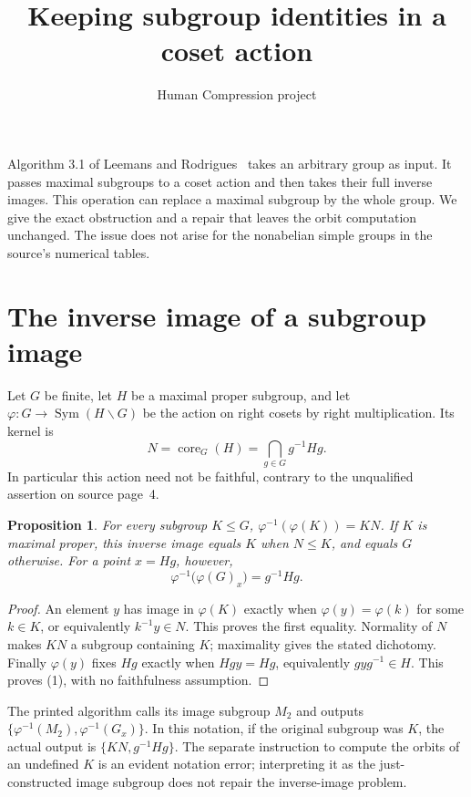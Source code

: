 \documentclass[10pt,a4paper]{article}
\title{Keeping subgroup identities in a coset action}
\author{Human Compression project}
\date{}
\newtheorem{proposition}{Proposition}
\newcommand{\core}{\operatorname{core}}
\begin{document}
\maketitle

Algorithm 3.1 of Leemans and Rodrigues~\cite{LR} takes an arbitrary
group as input. It passes maximal subgroups to a coset action and then
takes their full inverse images. This operation can replace a maximal
subgroup by the whole group. We give the exact obstruction and a repair
that leaves the orbit computation unchanged. The issue does not arise
for the nonabelian simple groups in the source's numerical tables.

\section{The inverse image of a subgroup image}
Let $G$ be finite, let $H$ be a maximal proper subgroup, and let
$\varphi:G\longrightarrow\operatorname{Sym}(H\backslash G)$
be the action on right cosets by right multiplication. Its kernel is
\[
 N=\core_G(H)=\bigcap_{g\in G}g^{-1}Hg.
\]
In particular this action need not be faithful, contrary to the
unqualified assertion on source page~4.

\begin{proposition}\label{preimage}
For every subgroup $K\leq G$,
$\varphi^{-1}(\varphi(K))=KN$.
If $K$ is maximal proper, this inverse image equals $K$ when
$N\leq K$, and equals $G$ otherwise. For a point $x=Hg$, however,
\[
 \varphi^{-1}\bigl(\varphi(G)_x\bigr)=g^{-1}Hg.
 \tag{1}
\]
\end{proposition}
\begin{proof}
An element $y$ has image in $\varphi(K)$ exactly when
$\varphi(y)=\varphi(k)$ for some $k\in K$, or equivalently
$k^{-1}y\in N$. This proves the first equality. Normality of $N$
makes $KN$ a subgroup containing $K$; maximality gives the stated
dichotomy. Finally $\varphi(y)$ fixes $Hg$ exactly when
$Hgy=Hg$, equivalently $gyg^{-1}\in H$. This proves (1), with
no faithfulness assumption.
\end{proof}

The printed algorithm calls its image subgroup $M_2$ and outputs
$\{\varphi^{-1}(M_2),\varphi^{-1}(G_x)\}$. In this notation,
if the original subgroup was $K$, the actual output is
$\{KN,g^{-1}Hg\}$. The separate instruction to compute the orbits
of an undefined $K$ is an evident notation error; interpreting it as
the just-constructed image subgroup does not repair the inverse-image
problem.
\end{document}

